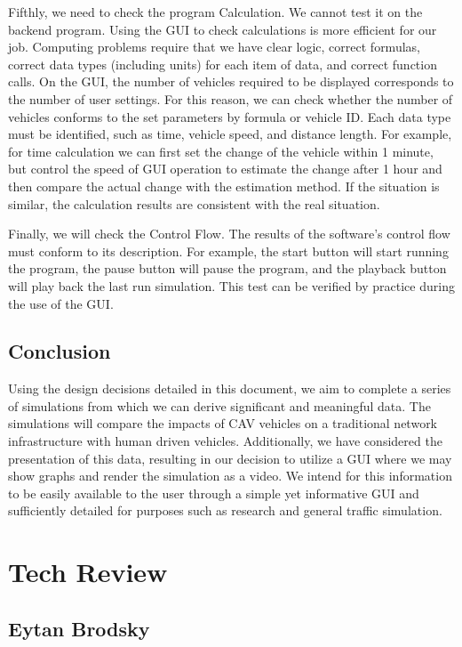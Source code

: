 \documentclass[onecolumn, draftclsnofoot,10pt, compsoc]{IEEEtran}
\begin{document}
Fifthly, we need to check the program Calculation.
We cannot test it on the backend program.
Using the GUI to check calculations is more efficient for our job.
Computing problems require that we have clear logic, correct formulas, correct data types (including units) for each item of data, and correct function calls.
On the GUI, the number of vehicles required to be displayed corresponds to the number of user settings.
For this reason, we can check whether the number of vehicles conforms to the set parameters by formula or vehicle ID.
Each data type must be identified, such as time, vehicle speed, and distance length.
For example, for time calculation we can first set the change of the vehicle within 1 minute, but control the speed of GUI operation to estimate the change after 1 hour and then compare the actual change with the estimation method.
If the situation is similar, the calculation results are consistent with the real situation.

Finally, we will check the Control Flow.
The results of the software's control flow must conform to its description.
For example, the start button will start running the program, the pause button will pause the program, and the playback button will play back the last run simulation.
This test can be verified by practice during the use of the GUI.
\subsection{Conclusion}
Using the design decisions detailed in this document, we aim to complete a series of simulations from which we can derive significant and meaningful data.
The simulations will compare the impacts of CAV vehicles on a traditional network infrastructure with human driven vehicles.
Additionally, we have considered the presentation of this data, resulting in our decision to utilize a GUI where we may show graphs and render the simulation as a video.
We intend for this information to be easily available to the user through a simple yet informative GUI and sufficiently detailed for purposes such as research and general traffic simulation.
\newpage
\section{Tech Review}
\subsection{Eytan Brodsky}
\end{document}
